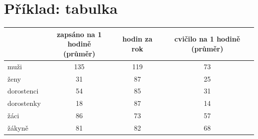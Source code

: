 \documentclass[a5paper, 12pt, twoside]{article}
\begin{document}
\clearpage
\section{Příklad: tabulka}
\begin{tabular}[pos]{l|ccc}

& \parbox{3cm}{\center{}zapsáno na 1 hodině\\(průměr)} & hodin za rok & \parbox{3cm}{\center{}cvičilo na 1 hodině (průměr)} \\
\hline
muži & 135 & 119 & 73 \\
ženy & 31 & 87 & 25 \\
dorostenci & 54 & 85 & 31 \\
dorostenky & 18 & 87 & 14 \\
žáci & 86 & 73 & 57 \\
žákyně & 81 & 82 & 68 \\
\end{tabular}
\end{document}
